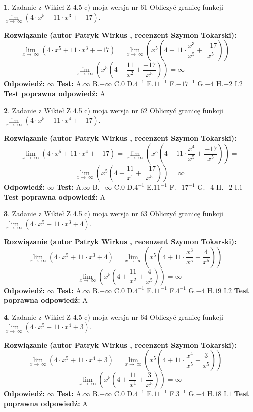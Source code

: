 \documentclass[12pt, a4paper]{article}
\theoremstyle{definition} %
\newtheorem{zad}{}
\newcommand{\zadStart}[1]{\begin{zad}#1\newline}
\newcommand{\zadStop}{\end{zad}}
\newcommand{\rozwStart}[2]{\noindent \textbf{Rozwiązanie (autor #1 , recenzent #2): }\newline}
\newcommand{\rozwStop}{\newline}
\newcommand{\odpStart}{\noindent \textbf{Odpowiedź:}\newline}
\newcommand{\odpStop}{\newline}
\newcommand{\testStart}{\noindent \textbf{Test:}\newline}
\newcommand{\testStop}{\newline}
\newcommand{\kluczStart}{\noindent \textbf{Test poprawna odpowiedź:}\newline}
\newcommand{\kluczStop}{\newline}
\begin{document}
\zadStart{Zadanie z Wikieł Z 4.5 c) moja wersja nr 61}
Obliczyć granicę funkcji  $\lim\limits_{x\to\ \infty}(4 \cdot x^{5}+11 \cdot x^{3}+-17)$.
\zadStop
\rozwStart{Patryk Wirkus}{Szymon Tokarski}
$$\lim\limits_{x\to\ \infty}(4 \cdot x^{5}+11 \cdot x^{3}+-17) = \lim\limits_{x\to\ \infty}(x^{5}(4 +11 \cdot \frac{x^{3}}{x^{5}}+\frac{-17}{x^{5}})) =$$ $$\lim\limits_{x\to\ \infty}(x^{5}(4 +\frac{11}{x^{2}}+\frac{-17}{x^{5}})) =\infty$$
\rozwStop
\odpStart
$\infty$
\odpStop
\testStart
A.$\infty$ B.$-\infty$ C.$0$ D.$4^{-1}$ E.$11^{-1}$
F.$-17^{-1}$ G.$-4$
H.$-2$
I.$2$
\testStop
\kluczStart
A
\kluczStop



\zadStart{Zadanie z Wikieł Z 4.5 c) moja wersja nr 62}
Obliczyć granicę funkcji  $\lim\limits_{x\to\ \infty}(4 \cdot x^{5}+11 \cdot x^{4}+-17)$.
\zadStop
\rozwStart{Patryk Wirkus}{Szymon Tokarski}
$$\lim\limits_{x\to\ \infty}(4 \cdot x^{5}+11 \cdot x^{4}+-17) = \lim\limits_{x\to\ \infty}(x^{5}(4 +11 \cdot \frac{x^{4}}{x^{5}}+\frac{-17}{x^{5}})) =$$ $$\lim\limits_{x\to\ \infty}(x^{5}(4 +\frac{11}{x^{1}}+\frac{-17}{x^{5}})) =\infty$$
\rozwStop
\odpStart
$\infty$
\odpStop
\testStart
A.$\infty$ B.$-\infty$ C.$0$ D.$4^{-1}$ E.$11^{-1}$
F.$-17^{-1}$ G.$-4$
H.$-2$
I.$1$
\testStop
\kluczStart
A
\kluczStop



\zadStart{Zadanie z Wikieł Z 4.5 c) moja wersja nr 63}
Obliczyć granicę funkcji  $\lim\limits_{x\to\ \infty}(4 \cdot x^{5}+11 \cdot x^{3}+4)$.
\zadStop
\rozwStart{Patryk Wirkus}{Szymon Tokarski}
$$\lim\limits_{x\to\ \infty}(4 \cdot x^{5}+11 \cdot x^{3}+4) = \lim\limits_{x\to\ \infty}(x^{5}(4 +11 \cdot \frac{x^{3}}{x^{5}}+\frac{4}{x^{5}})) =$$ $$\lim\limits_{x\to\ \infty}(x^{5}(4 +\frac{11}{x^{2}}+\frac{4}{x^{5}})) =\infty$$
\rozwStop
\odpStart
$\infty$
\odpStop
\testStart
A.$\infty$ B.$-\infty$ C.$0$ D.$4^{-1}$ E.$11^{-1}$
F.$4^{-1}$ G.$-4$
H.$19$
I.$2$
\testStop
\kluczStart
A
\kluczStop



\zadStart{Zadanie z Wikieł Z 4.5 c) moja wersja nr 64}
Obliczyć granicę funkcji  $\lim\limits_{x\to\ \infty}(4 \cdot x^{5}+11 \cdot x^{4}+3)$.
\zadStop
\rozwStart{Patryk Wirkus}{Szymon Tokarski}
$$\lim\limits_{x\to\ \infty}(4 \cdot x^{5}+11 \cdot x^{4}+3) = \lim\limits_{x\to\ \infty}(x^{5}(4 +11 \cdot \frac{x^{4}}{x^{5}}+\frac{3}{x^{5}})) =$$ $$\lim\limits_{x\to\ \infty}(x^{5}(4 +\frac{11}{x^{1}}+\frac{3}{x^{5}})) =\infty$$
\rozwStop
\odpStart
$\infty$
\odpStop
\testStart
A.$\infty$ B.$-\infty$ C.$0$ D.$4^{-1}$ E.$11^{-1}$
F.$3^{-1}$ G.$-4$
H.$18$
I.$1$
\testStop
\kluczStart
A
\kluczStop
\end{document}
